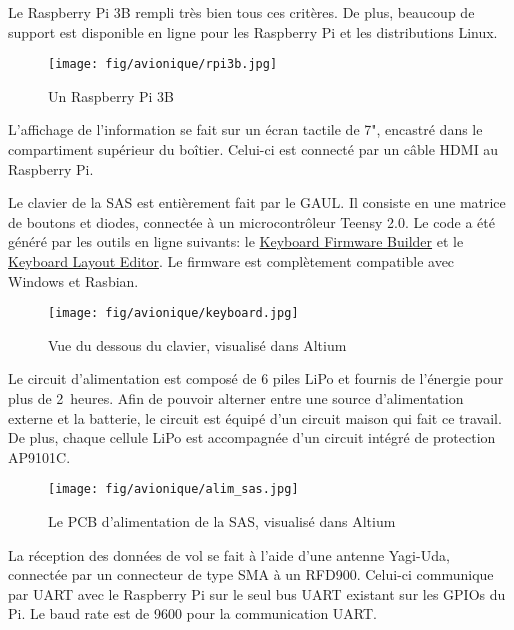 Le Raspberry Pi 3B rempli très bien tous ces critères. De plus, beaucoup de
support est disponible en ligne pour les Raspberry Pi et les distributions
Linux.

\begin{figure}[H]
	\center
	\texttt{[image: fig/avionique/rpi3b.jpg]}
	\caption{Un Raspberry Pi 3B}
	\label{f:rpi3b}
\end{figure}


L'affichage de l'information se fait sur un écran tactile de 7", encastré dans
le compartiment supérieur du boîtier. Celui-ci est connecté par un câble HDMI au
Raspberry Pi.


Le clavier de la SAS est entièrement fait par le GAUL. Il consiste en une
matrice de boutons et diodes, connectée à un microcontrôleur Teensy 2.0. Le
code a été généré par les outils en ligne suivants: le
\href{http://kbfirmware.com/}{Keyboard Firmware Builder} et le
\href{http://www.keyboard-layout-editor.com/}{Keyboard Layout Editor}. Le
firmware est complètement compatible avec Windows et Rasbian.

\begin{figure}[H]
	\center
	\texttt{[image: fig/avionique/keyboard.jpg]}
	\caption{Vue du dessous du clavier, visualisé dans Altium}
	\label{f:keyboard}
\end{figure}


Le circuit d'alimentation est composé de 6 piles LiPo et fournis de l'énergie
pour plus de 2~heures. Afin de pouvoir alterner entre une source d'alimentation
externe et la batterie, le circuit est équipé d'un circuit maison qui fait ce
travail. De plus, chaque cellule LiPo est accompagnée d'un circuit intégré de
protection AP9101C.

\begin{figure}[H]
	\center
	\texttt{[image: fig/avionique/alim\_sas.jpg]}
	\caption{Le PCB d'alimentation de la SAS, visualisé dans Altium}
	\label{f:alim_sas}
\end{figure}


La réception des données de vol se fait à l'aide d'une antenne Yagi-Uda,
connectée par un connecteur de type SMA à un RFD900. Celui-ci communique par
UART avec le Raspberry Pi sur le seul bus UART existant sur les GPIOs du Pi. Le
baud rate est de 9600 pour la communication UART.

